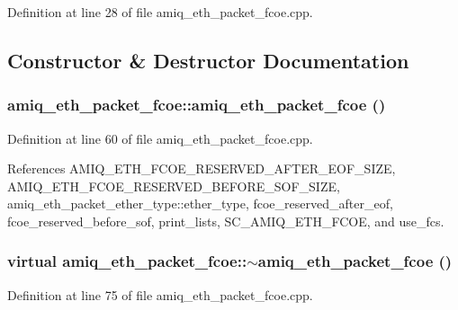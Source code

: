 Definition at line 28 of file amiq\_\-eth\_\-packet\_\-fcoe.cpp.

\subsection{Constructor \& Destructor Documentation}
\hypertarget{classamiq__eth__packet__fcoe_a8f9a82423c47abe1533b65751bc75e19}{
\subsubsection[{amiq\_\-eth\_\-packet\_\-fcoe}]{\setlength{\rightskip}{0pt plus 5cm}amiq\_\-eth\_\-packet\_\-fcoe::amiq\_\-eth\_\-packet\_\-fcoe ()}}
\label{classamiq__eth__packet__fcoe_a8f9a82423c47abe1533b65751bc75e19}


Definition at line 60 of file amiq\_\-eth\_\-packet\_\-fcoe.cpp.

References AMIQ\_\-ETH\_\-FCOE\_\-RESERVED\_\-AFTER\_\-EOF\_\-SIZE, AMIQ\_\-ETH\_\-FCOE\_\-RESERVED\_\-BEFORE\_\-SOF\_\-SIZE, amiq\_\-eth\_\-packet\_\-ether\_\-type::ether\_\-type, fcoe\_\-reserved\_\-after\_\-eof, fcoe\_\-reserved\_\-before\_\-sof, print\_\-lists, SC\_\-AMIQ\_\-ETH\_\-FCOE, and use\_\-fcs.\hypertarget{classamiq__eth__packet__fcoe_a44032a18eefcad771294b141167dcf14}{
\subsubsection[{$\sim$amiq\_\-eth\_\-packet\_\-fcoe}]{\setlength{\rightskip}{0pt plus 5cm}virtual amiq\_\-eth\_\-packet\_\-fcoe::$\sim$amiq\_\-eth\_\-packet\_\-fcoe ()}}
\label{classamiq__eth__packet__fcoe_a44032a18eefcad771294b141167dcf14}


Definition at line 75 of file amiq\_\-eth\_\-packet\_\-fcoe.cpp.

